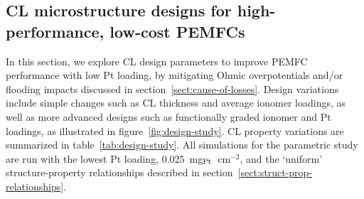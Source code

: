 \documentclass[final,3p,times,twocolumn]{elsarticle}    %
\newcommand{\crr}[1]{\color{red} #1 \color{black}}
\begin{document}


\subsection{CL microstructure designs for high-performance, low-cost PEMFCs}
\label{sect:design_study}
In this section, we explore CL design parameters to improve PEMFC performance with low Pt loading, by mitigating Ohmic overpotentials and/or flooding impacts discussed in section~\ref{sect:cause-of-losses}. Design variations include simple changes such as CL thickness and average ionomer loadings, as well as more advanced designs such as functionally graded ionomer and Pt loadings, as illustrated in figure~\ref{fig:design-study}. CL property variations are summarized in table~\ref{tab:design-study}. All simulations \crr{for the parametric study} are run with the lowest Pt loading, 0.025~mg$_{\rm Pt}$~cm$^{-2}$, \crr{and the `uniform' structure-property relationships described in section~\ref{sect:struct-prop-relationships}.}
\end{document}

